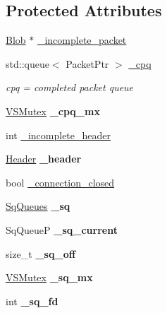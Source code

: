 \subsection*{Protected Attributes}
\begin{DoxyCompactItemize}
\item 
\hyperlink{structVsnetTCPSocket_1_1Blob}{Blob} $\ast$ \hyperlink{classVsnetTCPSocket_a977f743b1588c500ed5cd84a9914e485}{\+\_\+incomplete\+\_\+packet}
\item 
std\+::queue$<$ Packet\+Ptr $>$ \hyperlink{classVsnetTCPSocket_a1e2685f42647e00d3dbfdd2db35f082c}{\+\_\+cpq}\hypertarget{classVsnetTCPSocket_a1e2685f42647e00d3dbfdd2db35f082c}{}\label{classVsnetTCPSocket_a1e2685f42647e00d3dbfdd2db35f082c}

\begin{DoxyCompactList}\small\item\em cpq = completed packet queue \end{DoxyCompactList}\item 
\hyperlink{classVSMutex}{V\+S\+Mutex} {\bfseries \+\_\+cpq\+\_\+mx}\hypertarget{classVsnetTCPSocket_a0d938d65a6eebd09a46bcaadc4aeedf3}{}\label{classVsnetTCPSocket_a0d938d65a6eebd09a46bcaadc4aeedf3}

\item 
int \hyperlink{classVsnetTCPSocket_a698fa2d1de57dac543513891b3dfe034}{\+\_\+incomplete\+\_\+header}
\item 
\hyperlink{structVsnetTCPSocket_1_1Header}{Header} {\bfseries \+\_\+header}\hypertarget{classVsnetTCPSocket_af227f64a823924e82350c8eec6713c8d}{}\label{classVsnetTCPSocket_af227f64a823924e82350c8eec6713c8d}

\item 
bool \hyperlink{classVsnetTCPSocket_a2c8d5ffc121ac5e7d6fdffad7e4ddacd}{\+\_\+connection\+\_\+closed}
\item 
\hyperlink{classVsnetTCPSocket_1_1SqQueues}{Sq\+Queues} {\bfseries \+\_\+sq}\hypertarget{classVsnetTCPSocket_adacd2848865882477348d3f787d66952}{}\label{classVsnetTCPSocket_adacd2848865882477348d3f787d66952}

\item 
Sq\+QueueP {\bfseries \+\_\+sq\+\_\+current}\hypertarget{classVsnetTCPSocket_a0980ca1fef9c3c321eb5b6d5b725849a}{}\label{classVsnetTCPSocket_a0980ca1fef9c3c321eb5b6d5b725849a}

\item 
size\+\_\+t {\bfseries \+\_\+sq\+\_\+off}\hypertarget{classVsnetTCPSocket_a6fc6c7f2d10858b7da9aa69e4b848fbc}{}\label{classVsnetTCPSocket_a6fc6c7f2d10858b7da9aa69e4b848fbc}

\item 
\hyperlink{classVSMutex}{V\+S\+Mutex} {\bfseries \+\_\+sq\+\_\+mx}\hypertarget{classVsnetTCPSocket_a30a95d6c42a46f8a67878f265abb4ca6}{}\label{classVsnetTCPSocket_a30a95d6c42a46f8a67878f265abb4ca6}

\item 
int {\bfseries \+\_\+sq\+\_\+fd}\hypertarget{classVsnetTCPSocket_a857c5850332afe75124571fe7cdf7caf}{}\label{classVsnetTCPSocket_a857c5850332afe75124571fe7cdf7caf}

\end{DoxyCompactItemize}


